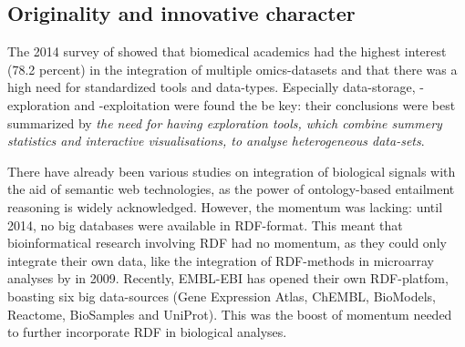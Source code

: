 \documentclass[twoside,fontsize=10pt]{article}
\begin{document}
\subsection*{Originality and innovative character} 
The 2014 survey of \citet{Gomez-Cabrero2014} showed that biomedical academics had the highest interest (78.2 percent) in the integration of multiple omics-datasets and that there was a high need for standardized tools and data-types. Especially data-storage, -exploration and -exploitation were found the be key: their conclusions were best summarized by \textit{the need for having exploration tools, which combine summery statistics and interactive visualisations, to analyse heterogeneous data-sets}.
\medskip

\noindent
There have already been various studies on integration of biological signals with the aid of semantic web technologies, as the power of ontology-based entailment reasoning is widely acknowledged\cite{Sahoo2008}. However, the momentum was lacking: until 2014, no big databases were available in RDF-format. This meant that bioinformatical research involving RDF had no momentum, as they could only integrate their own data, like the integration of RDF-methods in microarray analyses by \citet{Szpakowski2009} in 2009. Recently, EMBL-EBI has opened their own RDF-platfom, boasting six big data-sources (Gene Expression Atlas, ChEMBL, BioModels, Reactome, BioSamples and UniProt)\cite{Jupp2014}. This was the boost of momentum needed to further incorporate RDF in biological analyses.
\end{document}
